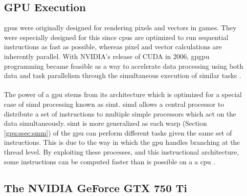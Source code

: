 \subsection{GPU Execution}\label{gpu:sec:opt}
\gls{gpu}s were originally designed for rendering pixels and vectors in games. They were especially designed for this since \gls{cpu}s are optimized to run sequential instructions as fast as possible, whereas pixel and vector calculations are inherently parallel. With NVIDIA's release of CUDA in 2006, \gls{gpgpu} programming became feasible as a way to accelerate data processing using both data and task parallelism through the simultaneous execution of similar tasks \citep{cuda_home}.
\\
\\
The power of a \gls{gpu} stems from its architecture which is optimized for a special case of \gls{simd} processing known as \gls{simt}. \gls{simd} allows a central processor to distribute a set of instructions to multiple simple processors which act on the data simultaneously. \gls{simt} is more generalized as each warp (Section \ref{gpu:ssec:smm}) of the \gls{gpu} can perform different tasks given the same set of instructions. This is due to the way in which the \gls{gpu} handles branching at the thread level. By exploiting these processes, and this instructional architecture, some instructions can be computed faster than is possible on a  a \gls{cpu} \citep{vuduc2013brief}.
\subsection{The NVIDIA GeForce GTX 750 Ti}\label{gpu:sec:750}
%
